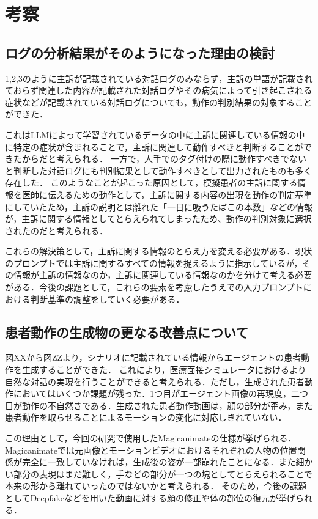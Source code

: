 \section{考察}\label{consideration}

\subsection{ログの分析結果がそのようになった理由の検討}\label{consideration_checklog}
1,2,3のように主訴が記載されている対話ログのみならず，主訴の単語が記載されておらず関連した内容が記載された対話ログやその病気によって引き起こされる症状などが記載されている対話ログについても，動作の判別結果の対象することができた．
\par
これはLLMによって学習されているデータの中に主訴に関連している情報の中に特定の症状が含まれることで，主訴に関連して動作すべきと判断することができたからだと考えられる．
一方で，人手でのタグ付けの際に動作すべきでないと判断した対話ログにも判別結果として動作すべきとして出力されたものも多く存在した．
このようなことが起こった原因として，模擬患者の主訴に関する情報を医師に伝えるための動作として，主訴に関する内容の出現を動作の判定基準にしていたため，主訴の説明とは離れた「一日に吸うたばこの本数」などの情報が，主訴に関する情報としてとらえられてしまったため、動作の判別対象に選択されたのだと考えられる．
\par
これらの解決策として，主訴に関する情報のとらえ方を変える必要がある．現状のプロンプトでは主訴に関するすべての情報を捉えるように指示しているが，その情報が主訴の情報なのか，主訴に関連している情報なのかを分けて考える必要がある．今後の課題として，これらの要素を考慮したうえでの入力プロンプトにおける判断基準の調整をしていく必要がある．

\subsection{患者動作の生成物の更なる改善点について}\label{consideration_generate}
図XXから図ZZより，シナリオに記載されている情報からエージェントの患者動作を生成することができた．
これにより，医療面接シミュレータにおけるより自然な対話の実現を行うことができると考えられる．ただし，生成された患者動作においてはいくつか課題が残った．1つ目がエージェント画像の再現度，二つ目が動作の不自然さである．生成された患者動作動画は，顔の部分が歪み，また患者動作を取らせることによるモーションの変化に対応しきれていない．
\par
この理由として，今回の研究で使用したMagicanimateの仕様が挙げられる．Magicanimateでは元画像とモーションビデオにおけるそれぞれの人物の位置関係が完全に一致していなければ，生成後の姿が一部崩れたことになる．また細かい部分の表現はまだ難しく，手などの部分が一つの塊としてとらえられることで本来の形から離れていったのではないかと考えられる．
そのため，今後の課題としてDeepfakeなどを用いた動画に対する顔の修正や体の部位の復元が挙げられる．

